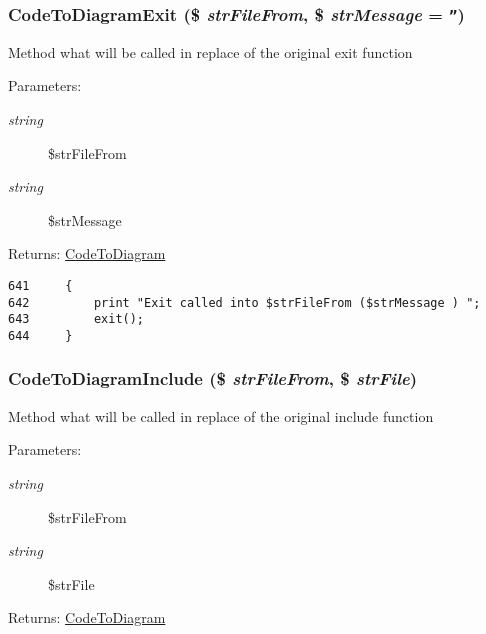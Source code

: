 \hypertarget{class_code_to_diagram_d18cd8b4121a7cb96ce7e89a88eef425}{
\subsubsection[{CodeToDiagramExit}]{\setlength{\rightskip}{0pt plus 5cm}CodeToDiagramExit (\$ {\em strFileFrom}, \/  \$ {\em strMessage} = {\tt ''})}}
\label{class_code_to_diagram_d18cd8b4121a7cb96ce7e89a88eef425}


Method what will be called in replace of the original exit function

\begin{Desc}
\item[Parameters:]
\begin{description}
\item[{\em string}]\$strFileFrom \item[{\em string}]\$strMessage \end{description}
\end{Desc}
\begin{Desc}
\item[Returns:]\hyperlink{class_code_to_diagram}{CodeToDiagram} \end{Desc}


\begin{Code}\begin{verbatim}641     {
642         print "Exit called into $strFileFrom ($strMessage ) ";
643         exit();
644     }
\end{verbatim}
\end{Code}


\hypertarget{class_code_to_diagram_cbf7ee26453936ec8211ff606f3ed6d3}{
\subsubsection[{CodeToDiagramInclude}]{\setlength{\rightskip}{0pt plus 5cm}CodeToDiagramInclude (\$ {\em strFileFrom}, \/  \$ {\em strFile})}}
\label{class_code_to_diagram_cbf7ee26453936ec8211ff606f3ed6d3}


Method what will be called in replace of the original include function

\begin{Desc}
\item[Parameters:]
\begin{description}
\item[{\em string}]\$strFileFrom \item[{\em string}]\$strFile \end{description}
\end{Desc}
\begin{Desc}
\item[Returns:]\hyperlink{class_code_to_diagram}{CodeToDiagram} \end{Desc}


